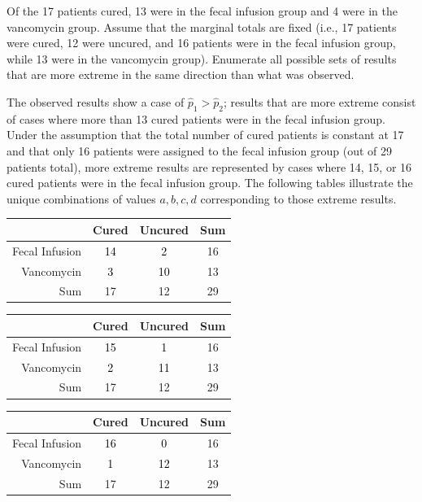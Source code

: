 \begin{example}{Of the 17 patients cured, 13 were in the fecal infusion group and 4 were in the vancomycin group. Assume that the marginal totals are fixed (i.e., 17 patients were cured, 12 were uncured, and 16 patients were in the fecal infusion group, while 13 were in the vancomycin group). Enumerate all possible sets of results that are more extreme in the same direction than what was observed.}
	
The observed results show a case of $\hat{p}_1 > \hat{p}_2$; results that are more extreme consist of cases where more than 13 cured patients were in the fecal infusion group. Under the assumption that the total number of cured patients is constant at 17 and that only 16 patients were assigned to the fecal infusion group (out of 29 patients total), more extreme results are represented by cases where 14, 15, or 16 cured patients were in the fecal infusion group. The following tables illustrate the unique combinations of values $a, b, c, d$ corresponding to those extreme results.

\begin{table}[h]
	\centering
	\color{gray}
	\begin{tabular}{r|cc|c}
		\hline
		& Cured & Uncured & Sum \\ 
		\hline
		Fecal Infusion & \textcolor{black}{14} & \textcolor{black}{2} & 16 \\ 
		Vancomycin & \textcolor{black}{3} & \textcolor{black}{10} & 13 \\ 
		\hline
		Sum & 17 & 12 & 29 \\ 
		\hline
	\end{tabular}
\end{table}

\begin{table}[h]
	\centering
	\color{gray}
	\begin{tabular}{r|cc|c}
		\hline
		& Cured & Uncured & Sum \\ 
		\hline
		Fecal Infusion & \textcolor{black}{15} & \textcolor{black}{1} & 16 \\ 
		Vancomycin & \textcolor{black}{2} & \textcolor{black}{11} & 13 \\ 
		\hline
		Sum & 17 & 12 & 29 \\ 
		\hline
	\end{tabular}
\end{table}

\begin{table}[h]
	\centering
	\color{gray}
	\begin{tabular}{r|cc|c}
		\hline
		& Cured & Uncured & Sum \\ 
		\hline
		Fecal Infusion & \textcolor{black}{16} & \textcolor{black}{0} & 16 \\ 
		Vancomycin & \textcolor{black}{1} & \textcolor{black}{12} & 13 \\ 
		\hline
		Sum & 17 & 12 & 29 \\ 
		\hline
	\end{tabular}
\end{table}
	
\label{fecalStudyExtreme}	
\end{example}

